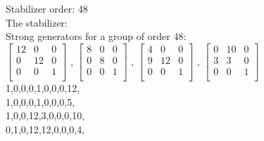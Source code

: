Stabilizer order: 48\\
The stabilizer: \\
Strong generators for a group of order 48:\\
$
\left[
\begin{array}{*{3}{r}}
12 & 0 & 0\\
0 & 12 & 0\\
0 & 0 & 1\\
\end{array}
\right]
$
, 
$
\left[
\begin{array}{*{3}{r}}
8 & 0 & 0\\
0 & 8 & 0\\
0 & 0 & 1\\
\end{array}
\right]
$
, 
$
\left[
\begin{array}{*{3}{r}}
4 & 0 & 0\\
9 & 12 & 0\\
0 & 0 & 1\\
\end{array}
\right]
$
, 
$
\left[
\begin{array}{*{3}{r}}
0 & 10 & 0\\
3 & 3 & 0\\
0 & 0 & 1\\
\end{array}
\right]
$
\\
1,0,0,0,1,0,0,0,12,\\
1,0,0,0,1,0,0,0,5,\\
1,0,0,12,3,0,0,0,10,\\
0,1,0,12,12,0,0,0,4,\\

